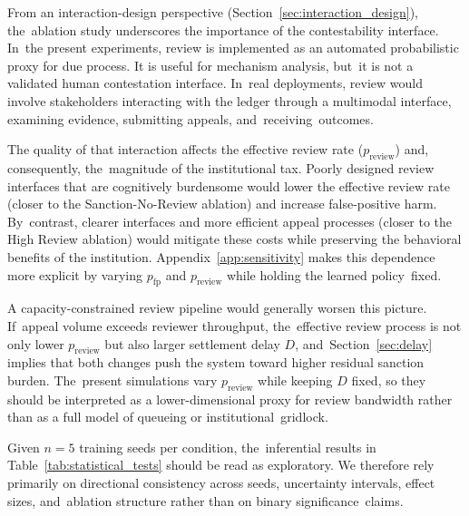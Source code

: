 \documentclass[mca,article,accept,pdftex,oneauthor]{Definitions/mdpi}
\begin{document}
From an interaction-design perspective (Section~\ref{sec:interaction_design}), the~ablation study underscores the importance of the contestability interface. In~the present experiments, review is implemented as an automated probabilistic proxy for due process. It is useful for mechanism analysis, but~it is not a validated human contestation interface. In~real deployments, review would involve stakeholders interacting with the ledger through a multimodal interface, examining evidence, submitting appeals, and~receiving~outcomes.

The quality of that interaction affects the effective review rate ($p_{\mathrm{review}}$) and, consequently, the~magnitude of the institutional tax. Poorly designed review interfaces that are cognitively burdensome would lower the effective review rate (closer to the Sanction-No-Review ablation) and increase false-positive harm. By~contrast, clearer interfaces and more efficient appeal processes (closer to the High Review ablation) would mitigate these costs while preserving the behavioral benefits of the institution. Appendix~\ref{app:sensitivity} makes this dependence more explicit by varying $p_{\mathrm{fp}}$ and $p_{\mathrm{review}}$ while holding the learned policy~fixed.

A capacity-constrained review pipeline would generally worsen this picture. If~appeal volume exceeds reviewer throughput, the~effective review process is not only lower $p_{\mathrm{review}}$ but also larger settlement delay $D$, and~Section~\ref{sec:delay} implies that both changes push the system toward higher residual sanction burden. The~present simulations vary $p_{\mathrm{review}}$ while keeping $D$ fixed, so they should be interpreted as a lower-dimensional proxy for review bandwidth rather than as a full model of queueing or institutional~gridlock.

Given $n=5$ training seeds per condition, the~inferential results in Table~\ref{tab:statistical_tests} should be read as exploratory. We therefore rely primarily on directional consistency across seeds, uncertainty intervals, effect sizes, and~ablation structure rather than on binary significance~claims.
\end{document}
